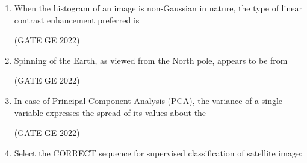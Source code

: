 \documentclass[journal,12pt,onecolumn]{IEEEtran}
\theoremstyle{remark}
\begin{document}
\begin{enumerate}
\item When the histogram of an image is non-Gaussian in nature, the type of linear contrast enhancement preferred is

\hfill (GATE GE 2022)

\begin{enumerate}
\end{enumerate}

\item Spinning of the Earth, as viewed from the North pole, appears to be from

\hfill (GATE GE 2022)

\begin{enumerate}
\end{enumerate}

\item In case of Principal Component Analysis (PCA), the variance of a single variable expresses the spread of its values about the

\hfill (GATE GE 2022)

\begin{enumerate}
\end{enumerate}

\item Select the CORRECT sequence for supervised classification of satellite image:


\end{enumerate}
\end{document}
